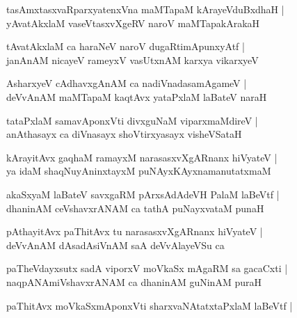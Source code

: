 \documentclass[twoside,12pt,openright]{book}
\newcounter{shloka}[chapter]
\begin{document}
\begin{shloka}%
tasAmxtasxvaRparxyatenxVna maMTapaM kArayeVduBxdhaH |\\
yAvatAkxlaM vaseVtasxvXgeRV naroV maMTapakArakaH 
\end{shloka}

\begin{shloka}%
tAvatAkxlaM ca haraNeV naroV dugaRtimApunxyAtf |\\
janAnAM nicayeV rameyxV vasUtxnAM karxya vikarxyeV 
\end{shloka}

\begin{shloka}%
AsharxyeV cAdhavxgAnAM ca nadiVnadasamAgameV |\\
deVvAnAM maMTapaM kaqtAvx yataPxlaM laBateV naraH 
\end{shloka}

\begin{shloka}%
tataPxlaM samavAponxVti divxguNaM viparxmaMdireV |\\
anAthasayx ca diVnasayx shoVtirxyasayx visheVSataH 
\end{shloka}

\begin{shloka}%
kArayitAvx gaqhaM ramayxM narasasxvXgARnanx hiVyateV |\\
ya idaM shaqNuyAninxtayxM puNAyxKAyxnamanutatxmaM 
\end{shloka}

\begin{shloka}%
akaSxyaM laBateV savxgaRM pArxsAdAdeVH PalaM laBeVtf |\\
dhaninAM ceVshavxrANAM ca tathA puNayxvataM punaH 
\end{shloka}

\begin{shloka}%
pAthayitAvx paThitAvx tu narasasxvXgARnanx hiVyateV |\\
deVvAnAM dAsadAsiVnAM saA deVvAlayeVSu ca 
\end{shloka}

\begin{shloka}%
paTheVdayxsutx sadA viporxV moVkaSx mAgaRM sa gacaCxti |\\
naqpANAmiVshavxrANAM ca dhaninAM guNinAM puraH 
\end{shloka}

\begin{shloka}%
paThitAvx moVkaSxmAponxVti sharxvaNAtatxtaPxlaM laBeVtf |\\
\end{shloka}
\end{document}
